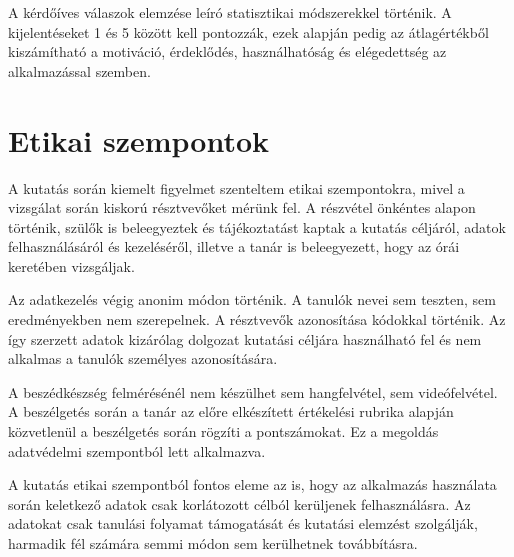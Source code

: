 A kérdőíves válaszok elemzése leíró statisztikai módszerekkel történik. A kijelentéseket 1 és 5 között kell pontozzák, ezek alapján pedig az átlagértékből kiszámítható a motiváció, érdeklődés, használhatóság és elégedettség az alkalmazással szemben.

\section{Etikai szempontok}
A kutatás során kiemelt figyelmet szenteltem etikai szempontokra, mivel a vizsgálat során kiskorú résztvevőket mérünk fel. A részvétel önkéntes alapon történik, szülők is beleegyeztek és tájékoztatást kaptak a kutatás céljáról, adatok felhasználásáról és kezeléséről, illetve a tanár is beleegyezett, hogy az órái keretében vizsgáljak.

Az adatkezelés végig anonim módon történik. A tanulók nevei sem teszten, sem eredményekben nem szerepelnek. A résztvevők azonosítása kódokkal történik. Az így szerzett adatok kizárólag dolgozat kutatási céljára használható fel és nem alkalmas a tanulók személyes azonosítására.

A beszédkészség felmérésénél nem készülhet sem hangfelvétel, sem videófelvétel. A beszélgetés során a tanár az előre elkészített értékelési rubrika alapján közvetlenül a beszélgetés során rögzíti a pontszámokat. Ez a megoldás adatvédelmi szempontból lett alkalmazva.

A kutatás etikai szempontból fontos eleme az is, hogy az alkalmazás használata során keletkező adatok csak korlátozott célból kerüljenek felhasználásra. Az adatokat csak tanulási folyamat támogatását és kutatási elemzést szolgálják, harmadik fél számára semmi módon sem kerülhetnek továbbításra.